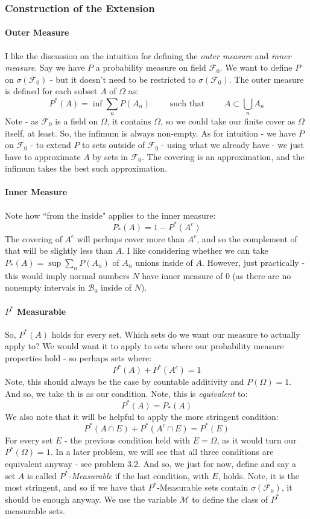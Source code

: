 \documentclass[12pt,a4paper]{article}
\newcommand{\1}[1]{\mathbbm{1}\left\{ #1 \right\}}
\newcommand{\fcal}{\mathcal{F}}
\newcommand{\bcal}{\mathcal{B}}
\newcommand{\mcal}{\mathcal{M}}
\begin{document}
\subsubsection{Construction of the Extension}
\paragraph{Outer Measure} I like the discussion on the intuition for defining the \textit{outer measure} and \textit{inner measure}. Say we have $P$ a probability measure on field $\fcal_0$. We want to define $P$ on $\sigma(\fcal_0)$ - but it doesn't need to be restricted to $\sigma(\fcal_0)$. The outer measure is defined for each subset $A$ of $\Omega$ as:
$$
	P^*(A) = \inf \sum_n P(A_n) \quad\quad \text{ such that } \quad\quad A \subset \bigcup_n A_n
$$
Note - as $\fcal_0$ is a field on $\Omega$, it contains $\Omega$, so we could take our finite cover as $\Omega$ itself, at least. So, the infimum is always non-empty. As for intuition - we have $P$ on $\fcal_0$ - to extend $P$ to sets outside of $\fcal_0$ - using what we already have - we just have to approximate $A$ by sets in $\fcal_0$. The covering is an approximation, and the infimum takes the best such approximation.

\paragraph{Inner Measure} Note how ``from the inside" applies to the inner measure:
$$
	P_*(A) = 1 - P^*(A^c)
$$
The covering of $A^c$ will perhaps cover more than $A^c$, and so the complement of that will be slightly less than $A$. I like considering whether we can take $P_*(A) = \sup \sum_n P(A_n)$ of $A_n$ unions inside of $A$. However, just practically - this would imply normal numbers $N$ have inner measure of $0$ (as there are no nonempty intervals in $\bcal_0$ inside of $N$).

\paragraph{$P^*$ Measurable} So, $P^*(A)$ holds for every set. Which sets do we want our measure to actually apply to? We would want it to apply to sets where our probability measure properties hold - so perhaps sets where:
$$
	P^*(A) + P^*(A^c) = 1
$$
Note, this should always be the case by countable additivity and $P(\Omega) = 1$. And so, we take th is as our condition. Note, this is \textit{equivalent} to:
$$
	P^*(A) = P_*(A)
$$
We also note that it will be helpful to apply the more stringent condition:
$$
	P^*(A \cap E) + P^*(A^c \cap E) = P^*(E)
$$
For every set $E$ - the previous condition held with $E = \Omega$, as it would turn our $P^*(\Omega) = 1$. In a later problem, we will see that all three conditions are equivalent anyway - see problem 3.2. And so, we just for now, define and say a set $A$ is called \textit{$P^*$-Measurable} if the last condition, with $E$, holds. Note, it is the most stringent, and so if we have that $P^*$-Measurable sets contain $\sigma(\fcal_0)$, it should be enough anyway. We use the variable $\mcal$ to define the class of $P^*$ measurable sets.
\end{document}

